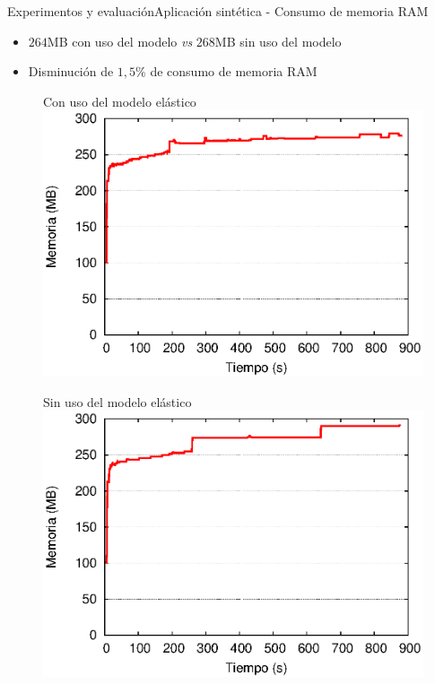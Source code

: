 \begin{frame}{Experimentos y evaluación}{Aplicación sintética - Consumo de memoria RAM}

\begin{itemize}
\item $264$MB con uso del modelo \textit{vs} $268$MB sin uso del modelo
\item Disminución de $1,5\%$ de consumo de memoria RAM
\end{itemize}

\begin{multicols}{2}
\begin{figure}[p]
	\centering
	{\scriptsize Con uso del modelo elástico\\}
	\includegraphics[scale=0.475]{images/exp/app3/cm/fisical/consumeRAM.eps}
\end{figure}

\begin{figure}[p]
	\centering
	{\scriptsize Sin uso del modelo elástico\\}
	\includegraphics[scale=0.475]{images/exp/app3/sm/fisical/consumeRAM.eps}
\end{figure}
\end{multicols}
\end{frame}


